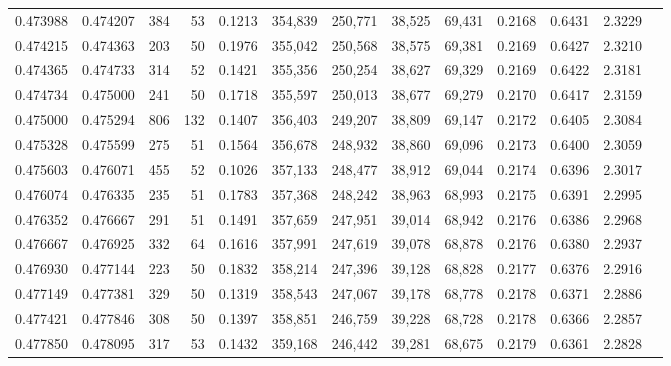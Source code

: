 \begin{tabular}{rrrrrrrrrrrrr}
0.473988 & 0.474207 &    384 &    53 &                                     0.1213 & 354,839 & 250,771 &  38,525 &  69,431 & 0.2168 & 0.6431 & 2.3229 \\
0.474215 & 0.474363 &    203 &    50 &                                     0.1976 & 355,042 & 250,568 &  38,575 &  69,381 & 0.2169 & 0.6427 & 2.3210 \\
0.474365 & 0.474733 &    314 &    52 &                                     0.1421 & 355,356 & 250,254 &  38,627 &  69,329 & 0.2169 & 0.6422 & 2.3181 \\
0.474734 & 0.475000 &    241 &    50 &                                     0.1718 & 355,597 & 250,013 &  38,677 &  69,279 & 0.2170 & 0.6417 & 2.3159 \\
0.475000 & 0.475294 &    806 &   132 &                                     0.1407 & 356,403 & 249,207 &  38,809 &  69,147 & 0.2172 & 0.6405 & 2.3084 \\
0.475328 & 0.475599 &    275 &    51 &                                     0.1564 & 356,678 & 248,932 &  38,860 &  69,096 & 0.2173 & 0.6400 & 2.3059 \\
0.475603 & 0.476071 &    455 &    52 &                                     0.1026 & 357,133 & 248,477 &  38,912 &  69,044 & 0.2174 & 0.6396 & 2.3017 \\
0.476074 & 0.476335 &    235 &    51 &                                     0.1783 & 357,368 & 248,242 &  38,963 &  68,993 & 0.2175 & 0.6391 & 2.2995 \\
0.476352 & 0.476667 &    291 &    51 &                                     0.1491 & 357,659 & 247,951 &  39,014 &  68,942 & 0.2176 & 0.6386 & 2.2968 \\
0.476667 & 0.476925 &    332 &    64 &                                     0.1616 & 357,991 & 247,619 &  39,078 &  68,878 & 0.2176 & 0.6380 & 2.2937 \\
0.476930 & 0.477144 &    223 &    50 &                                     0.1832 & 358,214 & 247,396 &  39,128 &  68,828 & 0.2177 & 0.6376 & 2.2916 \\
0.477149 & 0.477381 &    329 &    50 &                                     0.1319 & 358,543 & 247,067 &  39,178 &  68,778 & 0.2178 & 0.6371 & 2.2886 \\
0.477421 & 0.477846 &    308 &    50 &                                     0.1397 & 358,851 & 246,759 &  39,228 &  68,728 & 0.2178 & 0.6366 & 2.2857 \\
0.477850 & 0.478095 &    317 &    53 &                                     0.1432 & 359,168 & 246,442 &  39,281 &  68,675 & 0.2179 & 0.6361 & 2.2828 \\

\end{tabular}
